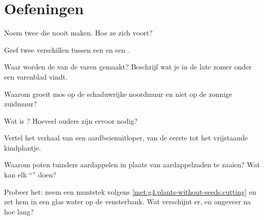 \section{Oefeningen}

\begin{exercise}[$\star$]\label{exo:g4:plants-without-seeds:1}
Noem twee  die nooit  maken. Hoe  ze zich voort?
\end{exercise}

\begin{exercise}[$\star$]\label{exo:g4:plants-without-seeds:2}
Geef twee verschillen tussen een  en een .
\end{exercise}

\begin{exercise}[$\star$]\label{exo:g4:plants-without-seeds:3}
Waar worden de  van de varen gemaakt? Beschrijf wat je in de late
zomer onder een varenblad vindt.
\end{exercise}

\begin{exercise}[$\star$]\label{exo:g4:plants-without-seeds:4}
Waarom groeit mos op de schaduwrijke noordmuur en niet op de zonnige
zuidmuur?
\end{exercise}

\begin{exercise}[$\star$]\label{exo:g4:plants-without-seeds:5}
Wat is ? Hoeveel ouders zijn ervoor nodig?
\end{exercise}

\begin{exercise}[$\star$]\label{exo:g4:plants-without-seeds:6}
Vertel het verhaal van een aardbeienuitloper, van de eerste  tot
het vrijstaande kindplantje.
\end{exercise}

\begin{exercise}[$\star$]\label{exo:g4:plants-without-seeds:7}
Waarom poten tuinders aardappelen in plaats van aardappelzaden te
zaaien? Wat kan elk ``'' doen?
\end{exercise}

\begin{exercise}[$\star$]\label{exo:g4:plants-without-seeds:8}
Probeer het: neem een muntstek volgens
\cref{met:g4:plants-without-seeds:cutting} en zet hem in een glas water
op de vensterbank. Wat verschijnt er, en ongeveer na hoe lang?
\end{exercise}

